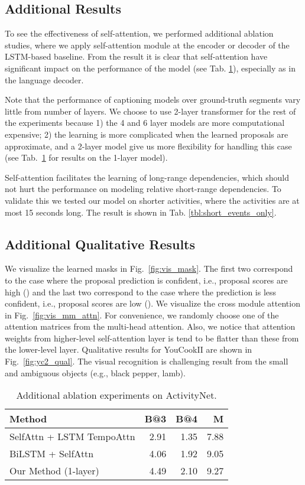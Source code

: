 \documentclass[10pt,twocolumn,letterpaper]{article}
\begin{document}
\subsection{Additional Results}
To see the effectiveness of self-attention, we performed additional ablation studies, where we apply self-attention module at the encoder or decoder of the LSTM-based baseline. From the result it is clear that self-attention have significant impact on the performance of the model (see Tab. \ref{tbl:rebuttal_anet}), especially as in the language decoder.

Note that the performance of captioning models over ground-truth segments vary little from number of layers. We choose to use 2-layer transformer for the rest of the experiments because 1) the 4 and 6 layer models are more computational expensive; 2) the learning is more complicated when the learned proposals are approximate, and a 2-layer model give us more flexibility for handling this case (see Tab.~\ref{tbl:rebuttal_anet} for results on the 1-layer model).

Self-attention facilitates the learning of long-range dependencies, which should not hurt the performance on modeling relative short-range dependencies. To validate this we tested our model on shorter activities, where the activities are at most 15 seconds long. The result is shown in Tab. \ref{tbl:short_events_only}.

\subsection{Additional Qualitative Results}
We visualize the learned masks in Fig.~\ref{fig:vis_mask}. The first two correspond to the case where the proposal prediction is confident, i.e., proposal scores are high () and the last two correspond to the case where the prediction is less confident, i.e., proposal scores are low ().
We visualize the cross module attention in Fig.~\ref{fig:vis_mm_attn}. For convenience, we randomly choose one of the attention matrices from the multi-head attention. Also, we notice that attention weights from higher-level self-attention layer is tend to be flatter than these from the lower-level layer.
Qualitative results for YouCookII are shown in Fig.~\ref{fig:yc2_qual}. The visual recognition is challenging result from the small and ambiguous objects (e.g., black pepper, lamb).

\begin{table}[t]
\centering
\caption{Additional ablation experiments on ActivityNet.}
\label{tbl:rebuttal_anet}
    {\small
\begin{tabular}{lrrr}
\toprule
Method & B@3 & B@4 & M \\
\midrule
SelfAttn + LSTM TempoAttn & 2.91 & 1.35 & 7.88 \\ BiLSTM + SelfAttn & 4.06 & 1.92 & 9.05 \\
Our Method (1-layer)  & 4.49 & 2.10 & 9.27 \\ \bottomrule
\end{tabular}
    }
\end{table}
\end{document}

